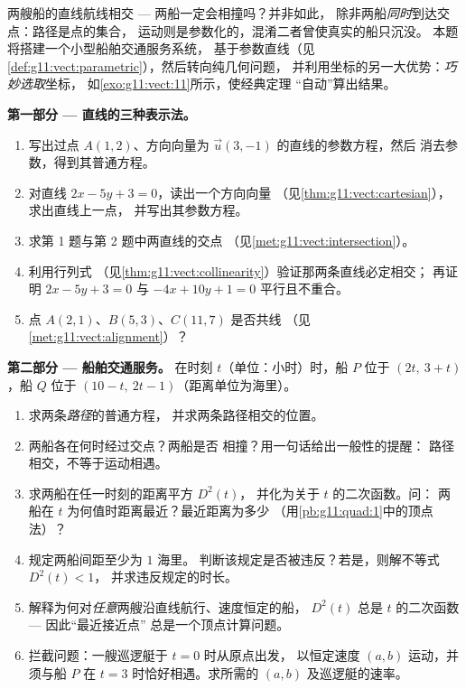 \begin{problem}
\label{pb:g11:vect:1}
两艘船的直线航线相交 --- 两船一定会相撞吗？并非如此，
除非两船\emph{同时}到达交点：路径是点的集合，
运动则是参数化的，混淆二者曾使真实的船只沉没。
本题将搭建一个小型船舶交通服务系统，
基于参数直线（见\cref{def:g11:vect:parametric}），然后转向纯几何问题，
并利用坐标的另一大优势：\emph{巧妙选取}坐标，
如\cref{exo:g11:vect:11}所示，使经典定理
“自动”算出结果。

\medskip
\noindent\textbf{第一部分 --- 直线的三种表示法。}
\begin{enumerate}
  \item 写出过点
        $A(1, 2)$、方向向量为 $\vec u(3, -1)$ 的直线的参数方程，然后
        消去参数，得到其普通方程。
  \item 对直线 $2x - 5y + 3 = 0$，读出一个方向向量
        （见\cref{thm:g11:vect:cartesian}），求出直线上一点，
        并写出其参数方程。
  \item 求第 1 题与第 2 题中两直线的交点
        （见\cref{met:g11:vect:intersection}）。
  \item 利用行列式
        （见\cref{thm:g11:vect:collinearity}）验证那两条直线必定相交；
        再证明 $2x - 5y + 3 = 0$ 与
        $-4x + 10y + 1 = 0$ 平行且不重合。
  \item 点 $A(2, 1)$、$B(5, 3)$、$C(11, 7)$ 是否共线
        （见\cref{met:g11:vect:alignment}）？
\end{enumerate}

\medskip
\noindent\textbf{第二部分 --- 船舶交通服务。}
在时刻 $t$（单位：小时）时，船 $P$ 位于 $(2t,\ 3 + t)$，船 $Q$
位于 $(10 - t,\ 2t - 1)$（距离单位为海里）。
\begin{enumerate}[resume]
  \item 求两条\emph{路径}的普通方程，
        并求两条路径相交的位置。
  \item 两船各在何时经过交点？两船是否
        相撞？用一句话给出一般性的提醒：
        路径相交，不等于运动相遇。
  \item 求两船在任一时刻的距离平方 $D^2(t)$，
        并化为关于 $t$ 的二次函数。问：
        两船在 $t$ 为何值时距离最近？最近距离为多少
        （用\cref{pb:g11:quad:1}中的顶点法）？
  \item 规定两船间距至少为 $1$ 海里。
        判断该规定是否被违反？若是，则解不等式 $D^2(t) < 1$，
        并求违反规定的时长。
  \item 解释为何对\emph{任意}两艘沿直线航行、速度恒定的船，
        $D^2(t)$ 总是
        $t$ 的二次函数 --- 因此“最近接近点”
        总是一个顶点计算问题。
  \item 拦截问题：一艘巡逻艇于 $t = 0$ 时从原点出发，
        以恒定速度 $(a, b)$ 运动，并须与船 $P$
        在 $t = 3$ 时恰好相遇。求所需的
        $(a, b)$ 及巡逻艇的速率。
\end{enumerate}


\end{problem}
